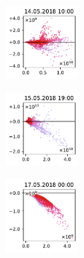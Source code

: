 \begin{figure}[H]
    \centering
    \begin{subfigure}
        \centering
        \includegraphics[width=0.30\textwidth,valign=t]{evaluation/figures/perturbations/perturbation-14.05.2018:10.00-nox-div-1.5.pdf}
    \end{subfigure}
    \begin{subfigure}
        \centering
        \includegraphics[width=0.30\textwidth,valign=t]{evaluation/figures/perturbations/perturbation-15.05.2018:19.00-nox-div-1.5.pdf}
    \end{subfigure}
    \begin{subfigure}
        \centering
        \includegraphics[width=0.30\textwidth,valign=t]{evaluation/figures/perturbations/perturbation-17.05.2018:00.00-nox-div-1.5.pdf}
    \end{subfigure}


\end{figure}
